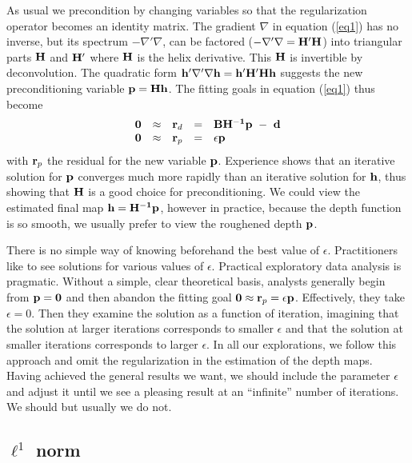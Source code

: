 As usual we
precondition by changing variables so
that the regularization operator becomes an identity matrix.
The gradient $\nabla$ in equation (\ref{eq1}) has no inverse, but its
spectrum $-\nabla'\nabla$,
can be factored ($-\nabla'\nabla={\bf H'H}$) into triangular parts 
${\bf H}$ and ${\bf H'}$ where ${\bf H}$ is the helix derivative.
This ${\bf H}$ is invertible by deconvolution.
The quadratic form
$\bold h'\nabla'\nabla\bold h = \bold h'\bold H'\bold H \bold h$
suggests the new preconditioning variable $\bold p = \bold H\bold h$.
The fitting goals in equation (\ref{eq1}) thus become
\begin{equation}
  \begin{array}{lllll}
    \bold 0 &\approx& \bold r_d &=& \bold B \bold {H^{-1}} \bold p \ -\  \bold d \\
    \bold 0 &\approx& \bold r_p &=& \epsilon \bold p
  \end{array} \label{eq2}
\end{equation}
with $\bold r_p$ the residual for the new variable ${\bf p}$.
Experience shows that an iterative solution for ${\bf p}$ converges much
more rapidly than an iterative solution for ${\bf h}$,
thus showing that ${\bf H}$ is a good choice for preconditioning. 
We could view the estimated final map ${\bf h}={\bf H^{-1}p}$,
however in practice, because the depth function is so smooth,
we usually prefer to view the roughened depth $\bold p$.


\par
There is no simple way of knowing beforehand the best value of $\epsilon$.
Practitioners like to see solutions for various values of $\epsilon$.
Practical exploratory data analysis is pragmatic.
Without a simple, clear theoretical basis, analysts
generally begin from ${\bf p=0}$ and then abandon the fitting goal
$\bold 0 \approx  \bold r_p =\epsilon \bold p$.
Effectively, they take $\epsilon=0$.
Then they examine the solution as a function
of iteration, imagining that the solution at larger iterations
corresponds to smaller $\epsilon$ and that the solution at smaller iterations
corresponds to larger $\epsilon$.
In all our explorations, we follow this approach
and omit the regularization in the estimation of the depth maps.
Having achieved the general results we want,
we should include the parameter $\epsilon$ and adjust it until
we see a pleasing result at an ``infinite'' number of iterations.
We should but usually we do not.


\subsection{${\ell^1}$ norm}


